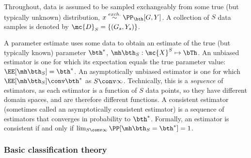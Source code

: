 Throughout, data is assumed to be sampled exchangeably from some true (but typically unknown) distribution, $x \overset{exch.}{\sim} \PP_{\bth}[G,Y]$.  A collection of $S$ data samples is denoted by $\mc{D}_S=\{(G_s,Y_s)\}$.





A parameter estimate uses some data to obtain an estimate of the true (but typically known) parameter $\bth^*$, $\hth_S: \mc{X}^S \mapsto \bTh$.  An unbiased estimator is one for which its expectation equals the true parameter value: $\EE[\hth_S] = \bth^*$.  An asymptotically unbiased estimator is one for which $\EE[\hth_S] \conv \bth^*$ as $S \conv \infty$. Technically, this is a \emph{sequence} of estimators, as each estimator is a function of $S$ data points, so they have different domain spaces, and are therefore different functions.   A consistent estimator (sometimes called an asymptotically consistent estimator) is a sequence of estimators that converges in probability to $\bth^*$. Formally, an estimator is consistent if and only if $\lim_{S\conv \infty} \PP[\hth_S=\bth^*]=1$.





\subsubsection{Basic classification theory} %
\label{sub:basic_classification_theory}


